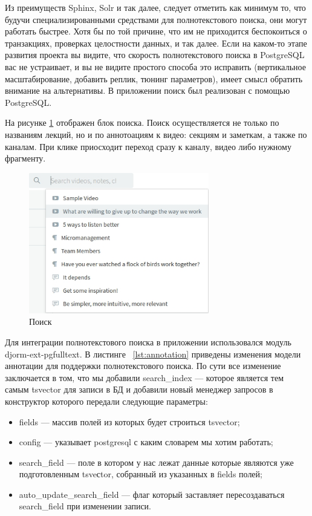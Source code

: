 Из преимуществ Sphinx, Solr и так далее, следует отметить как минимум то, что будучи специализированными
средствами для полнотекстового поиска, они могут работать быстрее. Хотя бы по той причине, что им не приходится
беспокоиться о транзакциях, проверках целостности данных, и так далее. Если на каком-то этапе развития проекта
вы видите, что скорость полнотекстового поиска в PostgreSQL вас не устраивает, и вы не видите простого способа
это исправить (вертикальное масштабирование, добавить реплик, тюнинг параметров), имеет смысл обратить внимание
на альтернативы. В приложении поиск был реализован с помощью PostgreSQL.

На рисунке \ref{search} отображен блок поиска. Поиск осуществляется не только по названиям лекций,
но и по аннотоациям к видео: секциям и заметкам, а также по каналам. При клике приосходит переход
сразу к каналу, видео либо нужному фрагменту.

\begin{figure}[H]
  \centering
  \includegraphics[width=0.7\textwidth]{images/search.jpg}
  \caption{Поиск}\label{search}
\end{figure}

Для интеграции полнотекстового поиска в приложении использовался модуль djorm-ext-pgfulltext. В листинге ~\ref{lst:annotation}
приведены изменения модели аннотации для поддержки полнотекстового поиска. По сути все изменение заключается в том,
что мы добавили search\_index — которое является тем самым tsvector для записи в БД и добавили
новый менеджер запросов в конструктор которого передали следующие параметры:

\begin{itemize}[wide,topsep=0pt]
  \itemsep0em
  \item fields — массив полей из которых будет строиться tsvector;
  \item config — указывает postgresql с каким словарем мы хотим работать;
  \item search\_field — поле в котором у нас лежат данные которые являются уже подготовленным tsveсtor, собранный из указанных в fields полей;
  \item auto\_update\_search\_field — флаг который заставляет пересоздаваться\\ search\_field при изменении записи.
\end{itemize}

